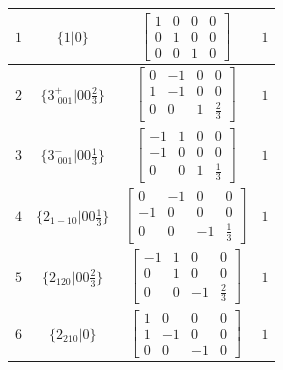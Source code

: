 \documentclass[fleqn,8pt]{jsarticle}
\begin{document}
\begin{longtable}{cccc}
$ 1 $ & $ \{1|0\} $ & $ \begin{bmatrix} 1 & 0 & 0 & 0 \\ 0 & 1 & 0 & 0 \\ 0 & 0 & 1 & 0 \end{bmatrix} $ & $ 1 $ \\ \hline
$ 2 $ & $ \{3^{+}_{\,\,001}|0 0 \frac{2}{3}\} $ & $ \begin{bmatrix} 0 & -1 & 0 & 0 \\ 1 & -1 & 0 & 0 \\ 0 & 0 & 1 & \frac{2}{3} \end{bmatrix} $ & $ 1 $ \\ \hline
$ 3 $ & $ \{3^{-}_{\,\,001}|0 0 \frac{1}{3}\} $ & $ \begin{bmatrix} -1 & 1 & 0 & 0 \\ -1 & 0 & 0 & 0 \\ 0 & 0 & 1 & \frac{1}{3} \end{bmatrix} $ & $ 1 $ \\ \hline
$ 4 $ & $ \{2{}_{1-10}|0 0 \frac{1}{3}\} $ & $ \begin{bmatrix} 0 & -1 & 0 & 0 \\ -1 & 0 & 0 & 0 \\ 0 & 0 & -1 & \frac{1}{3} \end{bmatrix} $ & $ 1 $ \\ \hline
$ 5 $ & $ \{2{}_{120}|0 0 \frac{2}{3}\} $ & $ \begin{bmatrix} -1 & 1 & 0 & 0 \\ 0 & 1 & 0 & 0 \\ 0 & 0 & -1 & \frac{2}{3} \end{bmatrix} $ & $ 1 $ \\ \hline
$ 6 $ & $ \{2{}_{210}|0\} $ & $ \begin{bmatrix} 1 & 0 & 0 & 0 \\ 1 & -1 & 0 & 0 \\ 0 & 0 & -1 & 0 \end{bmatrix} $ & $ 1 $ \\
\end{longtable}
\end{document}
